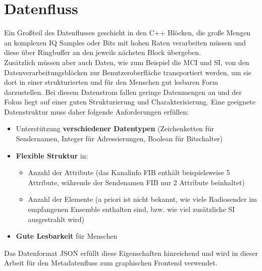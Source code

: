 \section{Datenfluss}
Ein Großteil des Datenflusses geschieht in den C++ Blöcken, die große Mengen an komplexen IQ Samples oder Bits mit hohen Raten verarbeiten müssen und diese über Ringbuffer an den jeweils nächsten Block übergeben. \\
Zusätzlich müssen aber auch Daten, wie zum Beispiel die MCI und SI, von den Datenverarbeitungsblöcken zur Benutzeroberfläche transportiert werden, um sie dort in einer strukturierten und für den Menschen gut lesbaren Form darzustellen. Bei diesem Datenstrom fallen geringe Datenmengen an und der Fokus liegt auf einer guten Strukturierung und Charakterisierung.
Eine geeignete Datenstruktur muss daher folgende Anforderungen erfüllen:
\begin{itemize}
\item Unterstützung \textbf{verschiedener Datentypen} (Zeichenketten für Sendernamen, Integer für Adressierungen, Boolean für Bitschalter)
\item \textbf{Flexible Struktur} in:
\begin{itemize}
\item Anzahl der Attribute (das Kanalinfo FIB enthält beispielsweise 5 Attribute, währende der Sendenamen FIB nur 2 Attribute beinhaltet)
\item Anzahl der Elemente (a priori ist nicht bekannt, wie viele Radiosender im empfangenen Ensemble enthalten sind, bzw. wie viel zusätzliche SI ausgestrahlt wird)
\end{itemize}
\item \textbf{Gute Lesbarkeit} für Menschen
\end{itemize}
Das Datenformat \ac{JSON} erfüllt diese Eigenschaften hinreichend und wird in dieser Arbeit für den Metadatenfluss zum graphischen Frontend verwendet.
